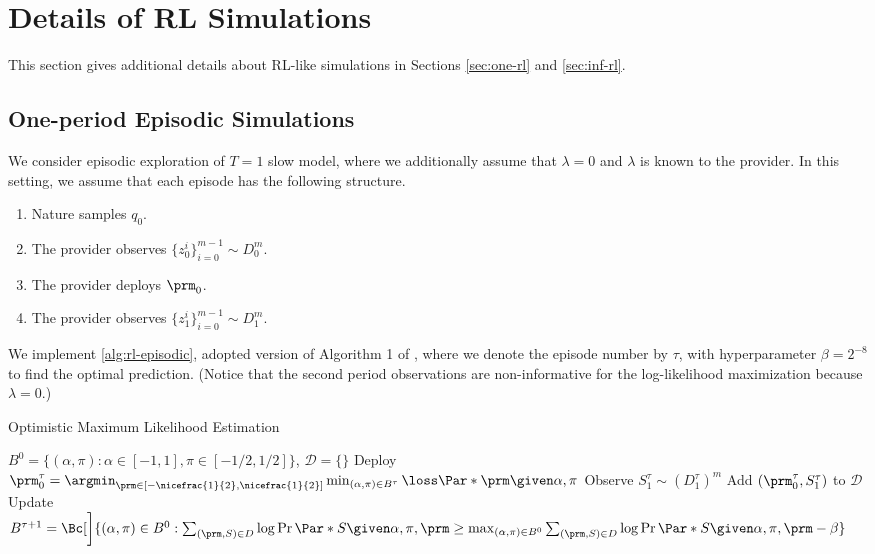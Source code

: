 \section{Details of RL Simulations}
\label{sec:add-rl}

This section gives additional details about RL-like simulations in Sections
\ref{sec:one-rl} and \ref{sec:inf-rl}.

\subsection{One-period Episodic Simulations}

We consider episodic exploration of $T=1$ slow model, where we additionally
assume that $\lambda = 0$ and $\lambda$ is known to the provider. In this
setting, we assume that each episode has the following structure.
\begin{enumerate}
    \item Nature samples $q_0$.
    \item The provider observes $\{z^i_0\}_{i=0}^{m-1} \sim D_0^m$.
    \item The provider deploys $\prm_0$.
    \item The provider observes $\{z^i_1\}_{i=0}^{m-1} \sim D_1^m$.
\end{enumerate}

We implement \cref{alg:rl-episodic}, adopted version of Algorithm 1 of
\citet{l22w}, where we denote the episode number by $\tau$, with hyperparameter
$\beta=2^{-8}$ to find the optimal prediction. (Notice that the second period
observations are non-informative for the log-likelihood maximization because
$\lambda = 0$.)

\begin{algorithm}[ht]
    \caption{Optimistic Maximum Likelihood Estimation}
    \label{alg:rl-episodic}
    \begin{algorithmic}
         $B^0 = \{(\alpha, \pi) : \alpha \in [-1,
        1], \pi \in [-1/2, 1/2]\}$, $\mathcal{D} = \{\}$
            \STATE Deploy $\prm^\tau_0 = \argmin_{\prm \in [-\nicefrac{1}{2},
            \nicefrac{1}{2}]} \min_{(\alpha, \pi) \in
            B^\tau} \loss\Par*{\prm \given \alpha, \pi}$
            \STATE Observe $S^\tau_1 \sim (D^\tau_1)^m$
            \STATE Add $(\prm^\tau_0, S^\tau_1)$ to $\mathcal{D}$
            \STATE Update $
                B^{\tau+1} = \Bc[\bigg]{(\alpha, \pi) \in B^0 : \sum_{(\prm, S)
                \in D} \log \Pr\Par*{S \given \alpha, \pi, \prm} \ge
                \max_{(\alpha, \pi) \in B^0} \sum_{(\prm, S) \in D} \log
                \Pr\Par*{S \given \alpha, \pi, \prm} - \beta}
                $
        \ENDFOR
    \end{algorithmic}
\end{algorithm}

